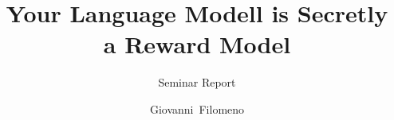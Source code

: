 \documentclass[a4paper,oneside,10pt,ngerman,english]{scrartcl}
\begin{document}

\title{Your Language Modell is Secretly a Reward Model}


\subtitle{Seminar Report}

\author{Giovanni~Filomeno }







\maketitle


\cleardoubleoddpage
\tableofcontents
\end{document}
